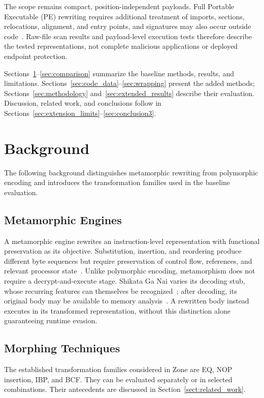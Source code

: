 \documentclass[runningheads]{llncs}
\begin{document}
The scope remains compact, position-independent payloads. Full Portable
Executable (PE) rewriting requires additional treatment of imports,
sections, relocations, alignment, and entry points, and signatures may
also occur outside code~\cite{sigdetPEnoncode}. Raw-file scan results and
payload-level execution tests therefore describe the tested representations,
not complete malicious applications or deployed endpoint protection.

Sections~\ref{sec:background}--\ref{sec:comparison} summarize the baseline
methods, results, and limitations. Sections~\ref{sec:code_data}--\ref{sec:wrapping}
present the added methods; Sections~\ref{sec:methodology} and~\ref{sec:extended_results}
describe their evaluation. Discussion, related work, and conclusions follow
in Sections~\ref{sec:extension_limits}--\ref{sec:conclusion3}.

\section{Background}\label{sec:background}

The following background distinguishes metamorphic rewriting from polymorphic encoding and introduces the transformation families used in the baseline evaluation.

\subsection{Metamorphic Engines}\label{sub:meth}
A metamorphic engine rewrites an instruction-level representation with
functional preservation as its objective. Substitution, insertion, and
reordering produce different byte sequences but require preservation of
control flow, references, and relevant processor state~\cite{historycodeobf,identifyingmeth,metworm}.
Unlike polymorphic encoding, metamorphism does not require a
decrypt-and-execute stage. Shikata Ga Nai varies its decoding stub, whose
recurring features can themselves be recognized~\cite{sgnstrong}; after
decoding, its original body may be available to memory analysis~\cite{codeExtraction}.
A rewritten body instead executes in its transformed representation,
without this distinction alone guaranteeing runtime evasion.

\subsection{Morphing Techniques}
The established transformation families considered in Zone are EQ, NOP insertion, IBP, and BCF. They can be evaluated separately or in selected combinations. Their antecedents are discussed in Section~\ref{sect:related_work}.
\end{document}
